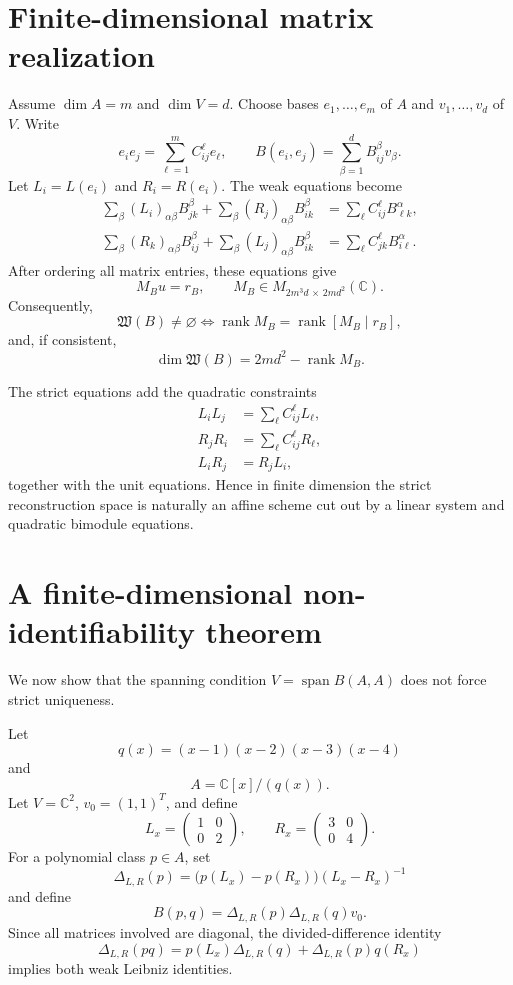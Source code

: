 \documentclass[11pt]{amsart}
\newcommand{\Span}{\operatorname{span}}
\newcommand{\rank}{\operatorname{rank}}
\newcommand{\Wfib}{\mathfrak W}
\newcommand{\C}{\mathbb C}
\begin{document}
\section{Finite-dimensional matrix realization}

Assume $\dim A=m$ and $\dim V=d$.  Choose bases $e_1,\dots,e_m$ of $A$ and $v_1,\dots,v_d$ of $V$.  Write
\[
e_i e_j=\sum_{\ell=1}^m C_{ij}^{\ell}e_\ell,
\qquad
B(e_i,e_j)=\sum_{\beta=1}^d B_{ij}^{\beta}v_\beta.
\]
Let $L_i=L(e_i)$ and $R_i=R(e_i)$.  The weak equations become
\begin{align}
\sum_{\beta}(L_i)_{\alpha\beta}B_{jk}^{\beta}
+\sum_{\beta}(R_j)_{\alpha\beta}B_{ik}^{\beta}
&=\sum_{\ell}C_{ij}^{\ell}B_{\ell k}^{\alpha}, \label{eq:matrix-left}\\
\sum_{\beta}(R_k)_{\alpha\beta}B_{ij}^{\beta}
+\sum_{\beta}(L_j)_{\alpha\beta}B_{ik}^{\beta}
&=\sum_{\ell}C_{jk}^{\ell}B_{i\ell}^{\alpha}. \label{eq:matrix-right}
\end{align}
After ordering all matrix entries, these equations give
\[
M_Bu=r_B,
\qquad
M_B\in M_{2m^3d\,\times\,2md^2}(\C).
\]
Consequently,
\[
\Wfib(B)\neq\varnothing
\iff
\rank M_B=\rank[M_B\mid r_B],
\]
and, if consistent,
\[
\dim\Wfib(B)=2md^2-\rank M_B.
\]

The strict equations add the quadratic constraints
\begin{align*}
L_iL_j&=\sum_{\ell}C_{ij}^{\ell}L_\ell,\\
R_jR_i&=\sum_{\ell}C_{ij}^{\ell}R_\ell,\\
L_iR_j&=R_jL_i,
\end{align*}
together with the unit equations.  Hence in finite dimension the strict reconstruction space is naturally an affine scheme cut out by a linear system and quadratic bimodule equations.

\section{A finite-dimensional non-identifiability theorem}\label{sec:finite-example}

We now show that the spanning condition $V=\Span B(A,A)$ does not force strict uniqueness.

Let
\[
q(x)=(x-1)(x-2)(x-3)(x-4)
\]
and
\[
A=\C[x]/(q(x)).
\]
Let $V=\C^2$, $v_0=(1,1)^T$, and define
\[
L_x=\begin{pmatrix}1&0\\0&2\end{pmatrix},
\qquad
R_x=\begin{pmatrix}3&0\\0&4\end{pmatrix}.
\]
For a polynomial class $p\in A$, set
\[
\Delta_{L,R}(p)=\bigl(p(L_x)-p(R_x)\bigr)(L_x-R_x)^{-1}
\]
and define
\[
B(p,q)=\Delta_{L,R}(p)\Delta_{L,R}(q)v_0.
\]
Since all matrices involved are diagonal, the divided-difference identity
\[
\Delta_{L,R}(pq)=p(L_x)\Delta_{L,R}(q)+\Delta_{L,R}(p)q(R_x)
\]
implies both weak Leibniz identities.
\end{document}
